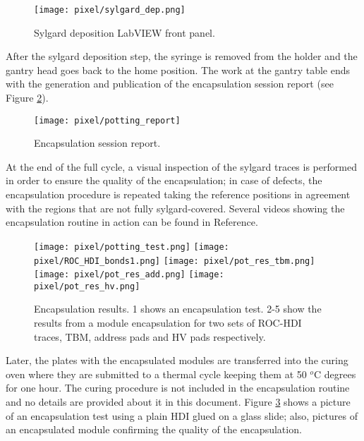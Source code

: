 \begin{figure}[h]
\begin{center}
  \texttt{[image: pixel/sylgard\_dep.png]}
  \caption{Sylgard deposition LabVIEW front panel.}\label{fig:sylgard_dep}
\end{center}
\end{figure}

After the sylgard deposition step, the syringe is removed from the holder and the gantry head goes back to the home position. The work at the gantry table ends with the generation and publication of the encapsulation session report (see Figure \ref{fig:potting_report}).   

\begin{figure}[h]
\begin{center}
  \texttt{[image: pixel/potting\_report]}
 \caption[Encapsulation session report.]{Encapsulation session report.}\label{fig:potting_report}
\end{center}
\end{figure}

At the end of the full cycle, a visual inspection of the sylgard traces is performed in order to ensure the quality of the encapsulation; in case of defects, the encapsulation procedure is repeated taking the reference positions in agreement with the regions that are not fully sylgard-covered. Several videos showing the encapsulation routine in action can be found in Reference\cite{jmonroy_channel}.

\begin{figure}[h]
\begin{center}
  \texttt{[image: pixel/potting\_test.png]}
  \texttt{[image: pixel/ROC\_HDI\_bonds1.png]}
  \texttt{[image: pixel/pot\_res\_tbm.png]}
  \texttt{[image: pixel/pot\_res\_add.png]}
  \texttt{[image: pixel/pot\_res\_hv.png]}
  \caption[Encapsulation results.]{Encapsulation results. 1 shows an encapsulation test. 2-5 show the results from a module encapsulation for two sets of ROC-HDI traces, TBM, address pads and HV pads respectively.}\label{fig:potted_module}
\end{center}
\end{figure}

Later, the plates with the encapsulated modules are transferred into the curing oven where they are submitted to a thermal cycle keeping them at 50 $^o$C degrees for one hour. The curing procedure is not included in the encapsulation routine and no details are provided about it in this document. Figure \ref{fig:potted_module} shows a picture of an encapsulation test using a plain HDI glued on a glass slide; also, pictures of an encapsulated module confirming the quality of the encapsulation.  

